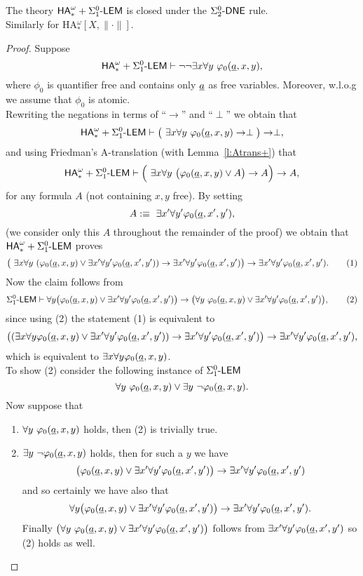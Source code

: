 \begin{prop}\label{p:Atrans}
The theory ${\textsf{\upshape HA}}^\omega_* + \Sigma^0_1\textsf{\upshape -LEM}$ is closed under the $\Sigma^0_2\textsf{\upshape -}\textsf{\upshape DNE}$ rule. \\ 
Similarly for HA$_*^{\omega}[X,\|\cdot\|].$
\end{prop}
\begin{proof} 
Suppose \[{\textsf{\upshape HA}}^\omega_* + \Sigma^0_1\textsf{\upshape -LEM} \vdash \neg\neg \exists x\forall y\ \varphi_0(\underline a,x,y),\]
where $\phi_0$ is quantifier free and contains only $\underline a$ as free variables. Moreover, w.l.o.g we assume that $\phi_0$ is atomic.  \\
Rewriting the negations in terms of ``$\rightarrow$'' and ``$\perp$'' we obtain that
\[\ha_* + \LEM \vdash \big(\ \exists x\forall y\ \phi_0(\tup a,x,y)\rightarrow\perp\big)\rightarrow \perp,\]
and using Friedman's A-translation (with Lemma~\ref{l:Atrans+}) that
\[\ha_* + \LEM \vdash \Big(\ \exists x\forall y\ \big(\phi_0(\tup a,x,y) \vee A\big)\rightarrow A\Big)\rightarrow A,\]
for any formula $A$ (not containing $x,y$ free). By setting \[A:\equiv\ \exists x'\forall y' \varphi_0(\underline a,x',y'),\]
(we consider only this $A$ throughout the remainder of the proof) we obtain that ${\textsf{\upshape HA}}^\omega_* + \Sigma^0_1\textsf{\upshape -LEM}$ proves
\[\big(\ \exists x\forall y\ (\varphi_0(\underline a,x,y) \vee \exists x'\forall y' \varphi_0(\underline a,x',y'))\rightarrow \exists x'\forall y' \varphi_0(\underline a,x',y')\big)\rightarrow \exists x'\forall y' \varphi_0(\underline a,x',y').\tag{1}\]
Now the claim follows from
\[
\Sigma^0_1\textsf{\upshape -LEM}\vdash \forall y\big(\varphi_0(\underline a,x,y) \vee \exists x'\forall y' \varphi_0(\underline a,x',y') \big) \rightarrow \big(\forall y\ \varphi_0(\underline a,x,y) \vee \exists x'\forall y' \varphi_0(\underline a,x',y')\big),
\tag{2}
\]
since using (2) the statement (1) is equivalent to
\[  \big((\exists x \forall y \varphi_0(\underline a,x,y) \vee \exists x'\forall y' \varphi_0(\underline a,x',y'))\rightarrow \exists x'\forall y' \varphi_0(\underline a,x',y')\big)\rightarrow \exists x'\forall y' \varphi_0(\underline a,x',y'),\]
which is equivalent to $\exists x\forall y \varphi_0(\underline a,x,y)$.\\
To show (2) consider the following instance of $\Sigma^0_1\textsf{\upshape -LEM}$
\[
\forall y\ \varphi_0(\underline a,x,y) \vee \exists y\ \neg\varphi_0(\underline a,x,y).
\]
Now suppose that
\begin{enumerate}
\item $\forall y\ \varphi_0(\underline a,x,y)$ holds, then (2) is trivially true.
\item $\exists y\ \neg \varphi_0(\underline a,x,y)$ holds, then for such a $y$ we have
\[
\big(\varphi_0(\underline a,x,y) \vee \exists x'\forall y' \varphi_0(\underline a,x',y') \big) \rightarrow \exists x'\forall y' \varphi_0(\underline a,x',y')
\]
and so certainly we have also that
\[
\forall y\big(\varphi_0(\underline a,x,y) \vee \exists x'\forall y' \varphi_0(\underline a,x',y') \big) \rightarrow \exists x'\forall y' \varphi_0(\underline a,x',y').
\]
Finally $\big(\forall y\ \varphi_0(\underline a,x,y) \vee \exists x'\forall y' \varphi_0(\underline a,x',y')\big)$ follows from $\exists x'\forall y' \varphi_0(\underline a,x',y')$ so (2) holds as well.
\end{enumerate}
\end{proof}

